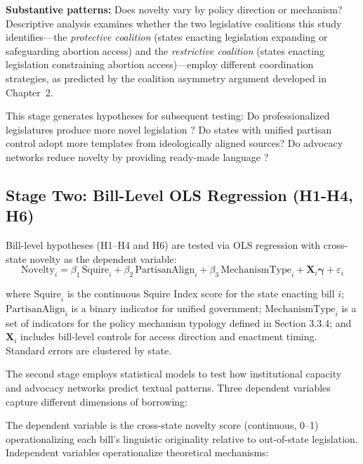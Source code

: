 \textbf{Substantive patterns:} Does novelty vary by policy direction or mechanism? Descriptive analysis examines whether the two legislative coalitions this study identifies---the \textit{protective coalition} (states enacting legislation expanding or safeguarding abortion access) and the \textit{restrictive coalition} (states enacting legislation constraining abortion access)---employ different coordination strategies, as predicted by the coalition asymmetry argument developed in Chapter~2.

This stage generates hypotheses for subsequent testing: Do professionalized legislatures produce more novel legislation \parencite{squireMeasuringStateLegislative2007}? Do states with unified partisan control adopt more templates from ideologically aligned sources? Do advocacy networks reduce novelty by providing ready-made language \parencite{hertel-fernandezStateCapture2019}?

\subsection{Stage Two: Bill-Level OLS Regression (H1-H4, H6)}
\label{sec:stage2}

Bill-level hypotheses (H1–H4 and H6) are tested via OLS regression with cross-state novelty as the dependent variable:
\begin{equation}
    \text{Novelty}_i = \beta_1\,\text{Squire}_i + \beta_2\,\text{PartisanAlign}_i + \beta_3\,\text{MechanismType}_i + \mathbf{X}_i\boldsymbol{\gamma} + \varepsilon_i
\end{equation}

where $\text{Squire}_{i}$ is the continuous Squire Index score for the state enacting bill $i$; $\text{PartisanAlign}_{i}$ is a binary indicator for unified government; $\text{MechanismType}_{i}$ is a set of indicators for the policy mechanism typology defined in Section 3.3.4; and $\mathbf{X}_i$ includes bill-level controls for access direction and enactment timing. Standard errors are clustered by state.

The second stage employs statistical models to test how institutional capacity and advocacy networks predict textual patterns. Three dependent variables capture different dimensions of borrowing:

The dependent variable is the cross-state novelty score (continuous, 0--1) operationalizing each bill's linguistic originality relative to out-of-state legislation. Independent variables operationalize theoretical mechanisms:

